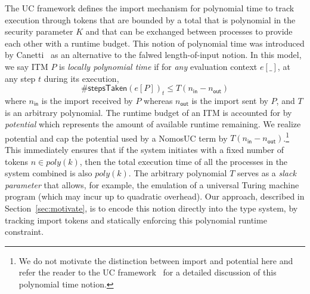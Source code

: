 The UC framework defines the import mechanism for polynomial time to track execution through tokens that
are bounded by a total that is polynomial in the security parameter $K$ and that can be exchanged between processes to provide each other with a runtime budget.
This notion of polynomial time was introduced by Canetti~\cite{canettiUC} as an alternative to the falwed length-of-input notion. 
In this model, we say ITM $P$ is \emph{locally polynomial time} if for \emph{any} evaluation context $e[\_]$, at any step $t$ during its execution,
\[
\#\textsf{stepsTaken}(e[P])_{t} \le T(n_{\textsf{in}} - n_{\textsf{out}})
\]
where $n_{\textsf{in}}$ is the import received by $P$ whereas $n_{\textsf{out}}$ is the import sent by $P$, and $T$ is an arbitrary polynomial.
The runtime budget of an ITM is accounted for by \emph{potential} which represents the amount of available runtime remaining.
We realize potential and cap the potential used by a NomosUC term by $T(n_\textsf{in}-n_\textsf{out})$.\footnote{We do not motivate the distinction between import and potential here and refer the reader to the UC framework~\cite{canettiUC} for a detailed discussion of this polynomial time notion.}
This immediately ensures that if the system initiates with a fixed number of tokens $n \in poly(k)$, then the total execution time
of all the processes in the system combined is also $poly(k)$.
The arbitrary polynomial $T$ serves as a \emph{slack parameter} that allows, for example,
the emulation of a universal Turing machine program (which may incur up to quadratic overhead).
Our approach, described in Section~\ref{sec:motivate}, is to encode this notion directly into the type system, by tracking import tokens and statically enforcing this polynomial runtime constraint.

